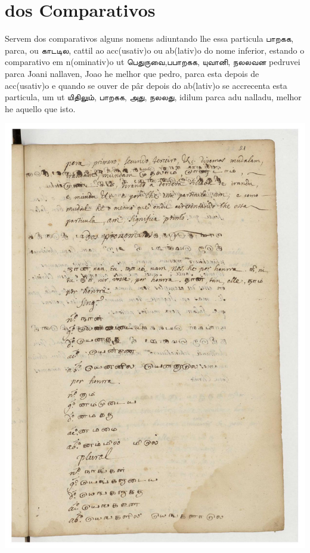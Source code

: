 \documentclass[12pt,a4paper]{scrbook}
\begin{document}
      \chapter*{dos Comparativos}
    
      

Servem dos comparativos alguns nomens adiuntando lhe essa particula பாறகக, parca, 
ou காடடில, cattil ao acc(usativ)o ou ab(lativ)o do nome inferior, estando o 
comparativo em n(ominativ)o ut பெதுருவை,பபாறகக, யுவானி, நலலவன pedruvei parca Joani 
nallaven, Joao he melhor que pedro, parca esta depois de acc(usativ)o e quando se 
ouver de pâr depois do ab(lativ)o se accrecenta esta particula, um ut யிதிலும், 
பாறகக, அது, நலலது, idilum parca adu nalladu, melhor he aquello que isto. 
	
      
\newpage
\hypertarget{img-51}{
    \includegraphics[width=\textwidth]{img-51}}
\newpage
\end{document}
